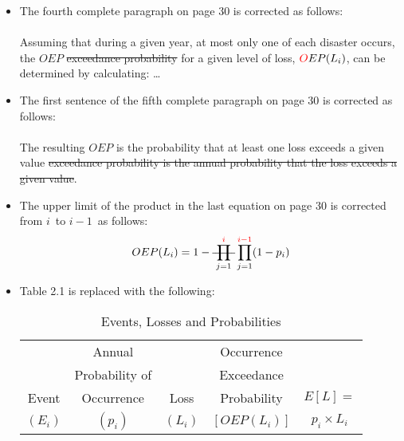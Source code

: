 \documentclass[]{article}
\newcommand{\sti}{
		{\mbox{\st{
					$\displaystyle\prod_{j = 1}^{\color{red}i\color{black}}$
				}}}
	}
\begin{document}
\begin{itemize}
\item The fourth complete paragraph on page 30 is corrected as follows:\\
\\
Assuming that during a given year, at most only one \color{red} of each \color{black} disaster occurs, the \color{red} $OEP$  \sout{exceedance probability} \color{black} for a given level of loss, $\color{red}O \color{black}EP(L_i)$, can be determined by calculating: \ldots
\item The first sentence of the fifth complete paragraph on page 30 is corrected as follows:\\
\\
The resulting \color{red} $OEP$ is the probability that at least one loss exceeds a given value  \sout{exceedance probability is the annual probability that the loss exceeds a given value}\color{black}.
\item The upper limit of the product in the last equation on page 30 is corrected from \color{red}$i$\color{black}~to \color{red}$i-1$\color{black}~as follows:
\begin{equation*}
	OEP(L_i) = 1 - \sti\prod_{j = 1}^{\color{red}i-1\color{black}}(1 - p_i)
\end{equation*}




\newpage
\item Table 2.1 is replaced with the following:
\begin{table}[h]
  \centering
  \caption{Events, Losses and Probabilities}
    \begin{tabular}{crrrr}
    \toprule
    
 & \multicolumn{1}{c}{Annual} & & \multicolumn{1}{c}{Occurrence}
 &   \\

 & \multicolumn{1}{c}{Probability of } & 
 & \multicolumn{1}{c}{Exceedance} &  \\

Event & \multicolumn{1}{c}{Occurrence} & \multicolumn{1}{c}{Loss}
 & \multicolumn{1}{c}{Probability} & \multicolumn{1}{c}{$E[L] =$ } \\

\multicolumn{1}{c}{$(E_i)$} & \multicolumn{1}{c}{$(p_i)$} & \multicolumn{1}{c}{$(L_i)$}
 & \multicolumn{1}{c}{$[OEP(L_i)]$} & \multicolumn{1}{c}{$p_i \times L_i$ } \\



\end{tabular}
\end{table}
\end{itemize}
\end{document}
